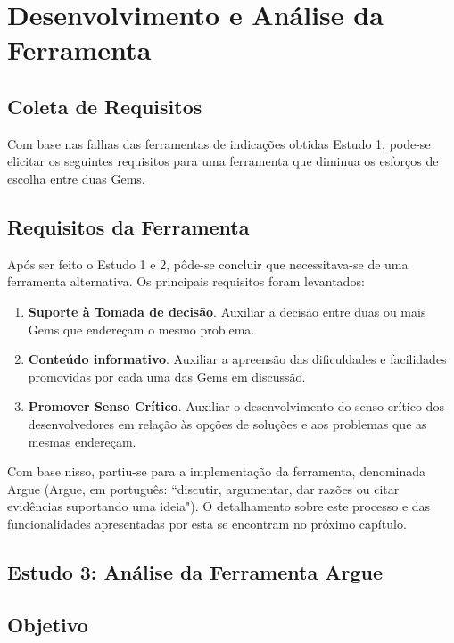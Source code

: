 \section{Desenvolvimento e Análise da Ferramenta}

\subsection{Coleta de Requisitos}

Com base nas falhas das ferramentas de indicações obtidas Estudo 1, pode-se
elicitar os seguintes requisitos para uma ferramenta que diminua os esforços de escolha entre duas Gems.

\subsection{Requisitos da Ferramenta}

Após ser feito o Estudo 1 e 2, pôde-se concluir que necessitava-se de uma ferramenta alternativa. Os principais requisitos foram levantados:

\begin{enumerate}

  \item \textbf{Suporte à Tomada de decisão}. Auxiliar a decisão entre duas ou mais Gems que endereçam o mesmo problema.
  
  \item \textbf{Conteúdo informativo}. Auxiliar a apreensão das dificuldades e facilidades promovidas por cada uma das Gems em discussão.
  
  \item \textbf{Promover Senso Crítico}. Auxiliar o desenvolvimento do senso crítico dos desenvolvedores em relação às opções de soluções e aos problemas que as mesmas endereçam.
  
\end{enumerate}

Com base nisso, partiu-se para a implementação da ferramenta, denominada Argue
(Argue, em português: “discutir, argumentar, dar razões ou citar evidências suportando uma ideia"). O
detalhamento sobre este processo e das funcionalidades apresentadas por esta se encontram
no próximo capítulo.

\subsection{Estudo 3: Análise da Ferramenta Argue}

\subsection{Objetivo}

